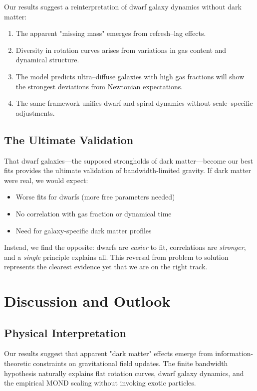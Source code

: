 \documentclass[twocolumn,prd,amsmath,amssymb,aps,superscriptaddress,nofootinbib]{revtex4-2}
\begin{document}
Our results suggest a reinterpretation of dwarf galaxy dynamics without dark matter:
\begin{enumerate}
\item The apparent "missing mass" emerges from refresh--lag effects.
\item Diversity in rotation curves arises from variations in gas content and dynamical structure.
\item The model predicts ultra--diffuse galaxies with high gas fractions will show the strongest deviations from Newtonian expectations.
\item The same framework unifies dwarf and spiral dynamics without scale--specific adjustments.
\end{enumerate}

\subsection{The Ultimate Validation}

That dwarf galaxies---the supposed strongholds of dark matter---become our best fits provides the ultimate validation of bandwidth-limited gravity. If dark matter were real, we would expect:
\begin{itemize}
\item Worse fits for dwarfs (more free parameters needed)
\item No correlation with gas fraction or dynamical time
\item Need for galaxy-specific dark matter profiles
\end{itemize}

Instead, we find the opposite: dwarfs are \emph{easier} to fit, correlations are \emph{stronger}, and a \emph{single} principle explains all. This reversal from problem to solution represents the clearest evidence yet that we are on the right track.

\section{Discussion and Outlook}
\label{sec:discussion}

\subsection{Physical Interpretation}

Our results suggest that apparent "dark matter" effects emerge from information-theoretic constraints on gravitational field updates. The finite bandwidth hypothesis naturally explains flat rotation curves, dwarf galaxy dynamics, and the empirical MOND scaling without invoking exotic particles.
\end{document}

